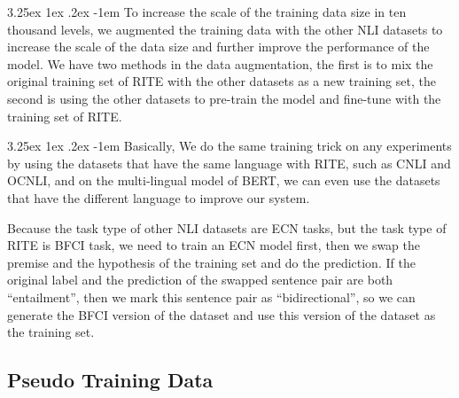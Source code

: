 \documentclass[12pt]{article}
\makeatletter
\renewcommand\paragraph{\@startsection{paragraph}{5}{\z@}%
  {3.25ex \@plus1ex \@minus.2ex}%
  {-1em}%
  {\normalfont\normalsize\bfseries}}
\makeatother
\begin{document}
\begin{CJK*}{UTF8}{bkai}
\begin{spacing}{1.77}
\paragraph{}
To increase the scale of the training data size in ten thousand levels, we augmented the training data with the other NLI datasets to increase the scale of the data size and further improve the performance of the model. We have two methods in the data augmentation, the first is to mix the original training set of RITE with the other datasets as a new training set, the second is using the other datasets to pre-train the model and fine-tune with the training set of RITE.

\paragraph{}
Basically, We do the same training trick on any experiments by using the datasets that have the same language with RITE, such as CNLI and OCNLI, and on the multi-lingual model of BERT, we can even use the datasets that have the different language to improve our system.

Because the task type of other NLI datasets are ECN tasks, but the task type of RITE is BFCI task, we need to train an ECN model first, then we swap the premise and the hypothesis of the training set and do the prediction. If the original label and the prediction of the swapped sentence pair are both ``entailment'', then we mark this sentence pair as ``bidirectional'', so we can generate the BFCI version of the dataset and use this version of the dataset as the training set.

\subsection{Pseudo Training Data}

\end{spacing}
\end{CJK*}
\end{document}
